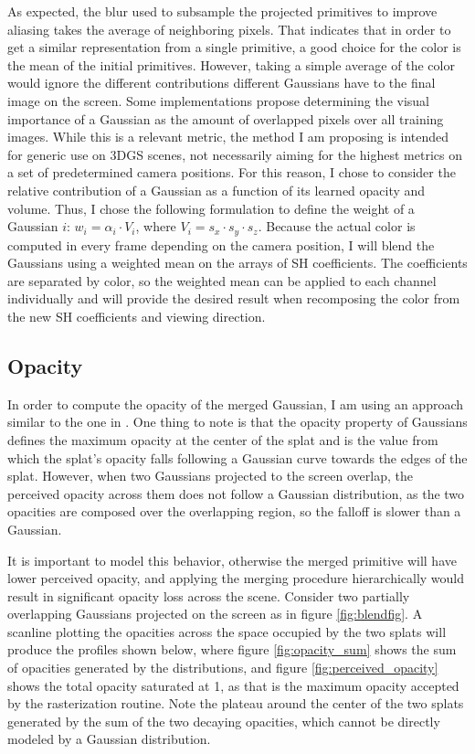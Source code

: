 As expected, the blur used to subsample the projected primitives to improve aliasing takes the average of neighboring pixels. That indicates that in order to get a similar representation from a single primitive, a good choice for the color is the mean of the initial primitives. However, taking a simple average of the color would ignore the different contributions different Gaussians have to the final image on the screen. Some implementations propose determining the visual importance of a Gaussian as the amount of overlapped pixels over all training images. While this is a relevant metric, the method I am proposing is intended for generic use on 3DGS scenes, not necessarily aiming for the highest metrics on a set of predetermined camera positions. For this reason, I chose to consider the relative contribution of a Gaussian as a function of its learned opacity and volume. Thus, I chose the following formulation to define the weight of a Gaussian $i$: $w_i = \alpha_i \cdot V_i$, where $V_i = s_x\cdot s_y \cdot s_z$. Because the actual color is computed in every frame depending on the camera position, I will blend the Gaussians using a weighted mean on the arrays of SH coefficients. The coefficients are separated by color, so the weighted mean can be applied to each channel individually and will provide the desired result when recomposing the color from the new SH coefficients and viewing direction. 

\subsection{Opacity}

In order to compute the opacity of the merged Gaussian, I am using an approach similar to the one in \cite{kerbl_hierarchy}. One thing to note is that the opacity property of Gaussians defines the maximum opacity at the center of the splat and is the value from which the splat's opacity falls following a Gaussian curve towards the edges of the splat. However, when two Gaussians projected to the screen overlap, the perceived opacity across them does not follow a Gaussian distribution, as the two opacities are composed over the overlapping region, so the falloff is slower than a Gaussian. 

It is important to model this behavior, otherwise the merged primitive will have lower perceived opacity, and applying the merging procedure hierarchically would result in significant opacity loss across the scene. Consider two partially overlapping Gaussians projected on the screen as in figure \ref{fig:blendfig}. A scanline plotting the opacities across the space occupied by the two splats will produce the profiles shown below, where figure \ref{fig:opacity_sum} shows the sum of opacities generated by the distributions, and figure \ref{fig:perceived_opacity} shows the total opacity saturated at 1, as that is the maximum opacity accepted by the rasterization routine. Note the plateau around the center of the two splats generated by the sum of the two decaying opacities, which cannot be directly modeled by a Gaussian distribution. 

